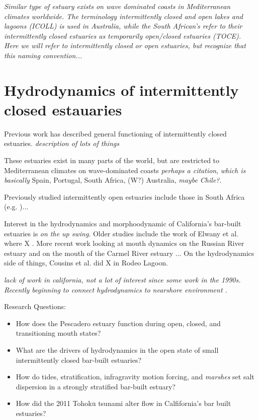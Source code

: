 \emph{Similar type of estuary exists on wave dominated coasts in Mediterranean climates worldwide. The terminology intermittently closed and open lakes and lagoons (ICOLL) is used in Australia, while the South African's refer to their intermittently closed estuaries as temporarily open/closed estuaries (TOCE).  Here we will refer to intermittently closed or open estuaries, but recognize that this naming convention... }

\section{Hydrodynamics of intermittently closed estauaries}
Previous work has described general functioning of intermittently closed estuaries.  
\emph{description of lots of things}

These estuaries exist in many parts of the world, but are restricted to Mediterranean climates on wave-dominated coasts \emph{perhaps a citation}, \emph{which is basically} Spain, Portugal, South Africa, (W?) Australia, \emph{maybe Chile?}. 

Previously studied intermittently open estuaries include those in South Africa (e.g. \cite{largier_dynamics_1991})...


Interest in the hydrodynamics and morphoodynamic of California's bar-built estuaries is \emph{on the up swing}. Older studies include the work of Elwany et al. where X \cite{elwany_opening_1998}. More recent work looking at mouth dynamics on the Russian River estuary \parencite{behrens_characterization_2009, behrens_episodic_2013} and on the mouth of the Carmel River estuary \parencite{rich_hydrologic_2013}... On the hydrodynamics side of things, Cousins et al. \cite{cousins_hydrodynamics_2011} did X in Rodeo Lagoon. 



\emph{lack of work in california, not a lot of interest since some work in the 1990s.  Recently beginning to connect hydrodynamics to nearshore environment \parencite{dodet_wave-current_2013, uncles_infragravity_2014}.}



Research Questions:
\begin{itemize}
	\item{How does the Pescadero estuary function during open, closed, and transitioning mouth states?}
	\item{What are the drivers of hydrodynamics in the open state of small intermittently closed bar-built estuaries?}
	\item{How do tides, stratification, infragravity motion forcing, and \emph{marshes} set salt dispersion in a strongly stratified bar-built estuary?}
	\item{How did the 2011 Tohok$\overline{\mathrm{u}}$ tsunami alter flow in Calfifornia's bar built estuaries?}
\end{itemize}




